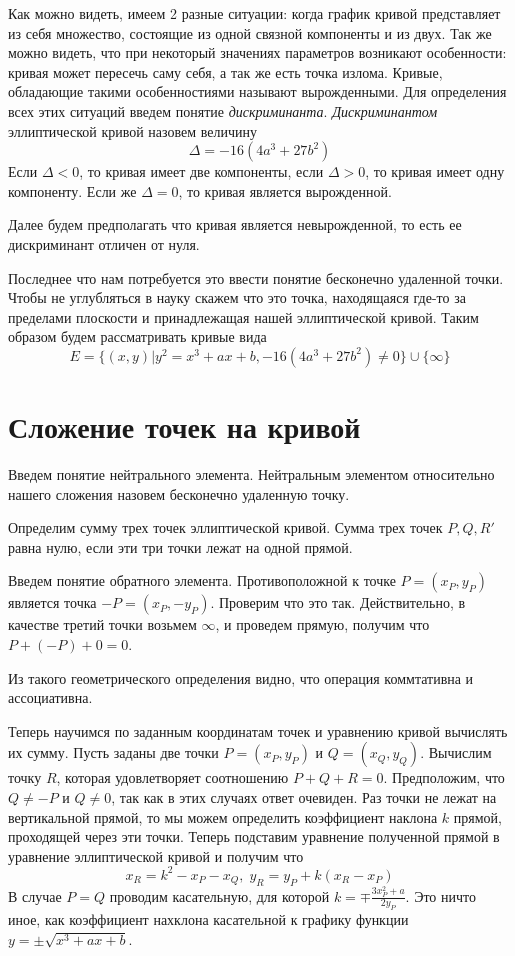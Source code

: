 \documentclass[a4paper,12pt]{article}
\begin{document}
        Как можно видеть, имеем 2 разные ситуации: когда график кривой представляет из себя множество, состоящие из одной связной 
        компоненты и из двух. Так же можно видеть, что при некоторый значениях параметров возникают особенности: кривая может пересечь саму себя,
        а так же есть точка излома. Кривые, обладающие такими особенностиями называют вырожденными. Для определения всех этих ситуаций введем
        понятие \textit{дискриминанта}. \textit{Дискриминантом} эллиптической кривой назовем величину 
        $$
            \Delta = -16(4a^3 + 27b^2)
        $$ 
        Если $\Delta < 0$, то кривая имеет две компоненты, если $\Delta > 0$, то кривая имеет одну компоненту. Если же
        $\Delta = 0$, то кривая является вырожденной.

        Далее будем предполагать что кривая является невырожденной, то есть ее дискриминант отличен от нуля. 

        Последнее что нам потребуется это ввести понятие бесконечно удаленной точки. Чтобы не углубляться в науку скажем что это точка, находящаяся где-то
        за пределами плоскости и принадлежащая нашей эллиптической кривой. Таким образом будем рассматривать кривые вида
        $$
            E = \{(x, y) | y^2 = x^3 + ax + b, -16(4a^3 + 27b^2) \neq 0\} \cup \{\infty\}
        $$

    \section{Сложение точек на кривой}
        Введем понятие нейтрального элемента. Нейтральным элементом относительно нашего сложения назовем бесконечно удаленную точку.

        Определим сумму трех точек эллиптической кривой. Сумма трех точек $P, Q, R'$ равна нулю, если эти три точки лежат
        на одной прямой. 

        Введем понятие обратного элемента. Противоположной к точке $P = (x_P, y_P)$ является точка $-P = (x_P, -y_P)$. Проверим что это так.
        Действительно, в качестве третий точки возьмем $\infty$, и проведем прямую, получим что $P + (-P) + 0 = 0$. 

        Из такого геометрического определения видно, что операция коммтативна и ассоциативна. 

        Теперь научимся по заданным координатам точек и уравнению кривой вычислять их сумму. Пусть заданы две точки $P = (x_P, y_P)$ и
        $Q = (x_Q, y_Q)$. Вычислим точку $R$, которая удовлетворяет соотношению $P + Q + R = 0$. Предположим, что $Q \neq -P$ и $Q \neq 0$,
        так как в этих случаях ответ очевиден. Раз точки не лежат на вертикальной прямой, то мы можем определить коэффициент наклона $k$ прямой,
        проходящей через эти точки. Теперь подставим уравнение полученной прямой в уравнение эллиптической кривой и получим что
        $$
            x_R = k^2 - x_P - x_Q,\;
            y_R = y_P + k(x_R - x_P)
        $$
        В случае $P = Q$ проводим касательную, для которой $k = \mp\frac{3x_P^2 + a}{2y_P}$. Это ничто иное, как коэффициент нахклона
        касательной к графику функции $y = \pm\sqrt{x^3 + ax + b}$.
\end{document}
